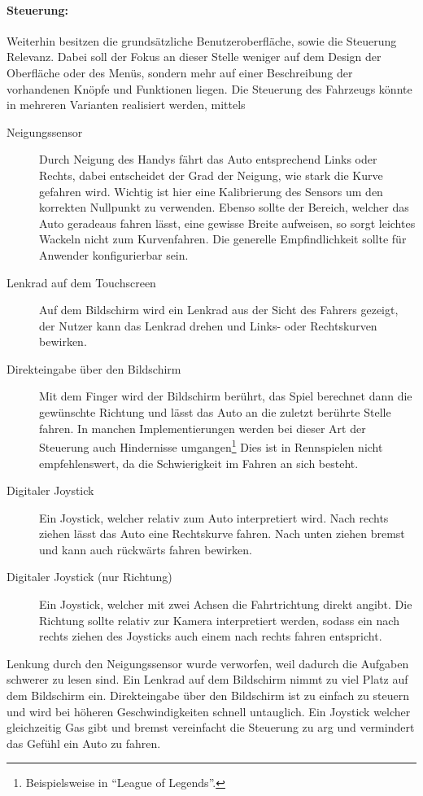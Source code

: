 		\paragraph{Steuerung:}
		Weiterhin besitzen die grundsätzliche Benutzeroberfläche, sowie die Steuerung Relevanz. Dabei soll der Fokus an dieser Stelle weniger auf dem Design der Oberfläche oder des Menüs, sondern mehr auf einer Beschreibung der vorhandenen Knöpfe und Funktionen liegen.
		Die Steuerung des Fahrzeugs könnte in mehreren Varianten realisiert werden, mittels
		\begin{description}
			\item[Neigungssensor]{ Durch Neigung des Handys fährt das Auto entsprechend Links oder Rechts, dabei entscheidet der Grad der Neigung, wie stark die Kurve gefahren wird. Wichtig ist hier eine Kalibrierung des Sensors um den korrekten Nullpunkt zu verwenden. Ebenso sollte der Bereich, welcher das Auto geradeaus fahren lässt, eine gewisse Breite aufweisen, so sorgt leichtes Wackeln nicht zum Kurvenfahren. Die generelle Empfindlichkeit sollte für Anwender konfigurierbar sein. }
			\item[Lenkrad auf dem Touchscreen]{ Auf dem Bildschirm wird ein Lenkrad aus der Sicht des Fahrers gezeigt, der Nutzer kann das Lenkrad drehen und Links- oder Rechtskurven bewirken. }
			\item[Direkteingabe über den Bildschirm]{ Mit dem Finger wird der Bildschirm berührt, das Spiel berechnet dann die gewünschte Richtung und lässt das Auto an die zuletzt berührte Stelle fahren. In manchen Implementierungen werden bei dieser Art der Steuerung auch Hindernisse umgangen\footnote{Beispielsweise in \enquote{League of Legends}.} Dies ist in Rennspielen nicht empfehlenswert, da die Schwierigkeit im Fahren an sich besteht.  }
			\item[Digitaler Joystick]{ Ein Joystick, welcher relativ zum Auto interpretiert wird. Nach rechts ziehen lässt das Auto eine Rechtskurve fahren. Nach unten ziehen bremst und kann auch rückwärts fahren bewirken. }
			\item[Digitaler Joystick (nur Richtung)]{ Ein Joystick, welcher mit zwei Achsen die Fahrtrichtung direkt angibt. Die Richtung sollte relativ zur Kamera interpretiert werden, sodass ein nach rechts ziehen des Joysticks auch einem nach rechts fahren entspricht. }
		\end{description}
		Lenkung durch den Neigungssensor wurde verworfen, weil dadurch die Aufgaben schwerer zu lesen sind.
		Ein Lenkrad auf dem Bildschirm nimmt zu viel Platz auf dem Bildschirm ein.
		Direkteingabe über den Bildschirm ist zu einfach zu steuern und wird bei höheren Geschwindigkeiten schnell untauglich.
		Ein Joystick welcher gleichzeitig Gas gibt und bremst vereinfacht die Steuerung zu arg und vermindert das Gefühl ein Auto zu fahren.

